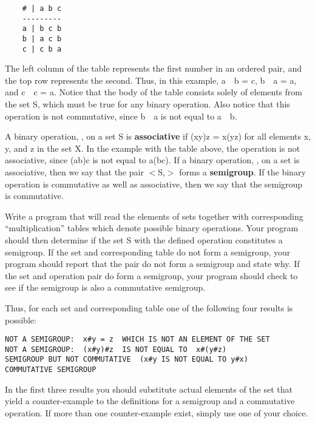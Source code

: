 \begin{verbatim}
	# | a b c
	---------
	a | b c b
	b | a c b
	c | c b a
\end{verbatim}

The left column of the table represents the first number in an ordered
pair, and the top row represents the second.  Thus, in this example,
a~\op~b = c, b~\op~a = a, and c~\op~c = a.  Notice that the body of
the table consists solely of elements from the set S, which must be
true for any binary operation.  Also notice that this operation is not
commutative, since b~\op~a is not equal to a~\op~b.

A binary operation, \op, on a set S is {\bf associative} if
(x{\op}y){\op}z = x{\op}(y{\op}z) for all elements x, y, and z in the
set X.  In the example with the table above, the operation is not
associative, since (a{\op}b){\op}c is not equal to a{\op}(b{\op}c).
If a binary operation, \op, on a set is associative, then we say that
the pair $<$S,\op$>$ forms a {\bf semigroup}.  If the binary operation
is commutative as well as associative, then we say that the semigroup
is commutative.

\bigskip
{}

Write a program that will read the elements of sets together with
corresponding ``multiplication'' tables which denote possible binary
operations.  Your program should then determine if the set S with the
defined operation constitutes a semigroup.  If the set and
corresponding table do not form a semigroup, your program should
report that the pair do not form a semigroup and state why.  If the
set and operation pair do form a semigroup, your program should check
to see if the semigroup is also a commutative semigroup.

Thus, for each set and corresponding table one of the following four
results is possible:

{\small
\begin{verbatim}
NOT A SEMIGROUP:  x#y = z  WHICH IS NOT AN ELEMENT OF THE SET
NOT A SEMIGROUP:  (x#y)#z  IS NOT EQUAL TO  x#(y#z)
SEMIGROUP BUT NOT COMMUTATIVE  (x#y IS NOT EQUAL TO y#x)
COMMUTATIVE SEMIGROUP
\end{verbatim}
}

In the first three results you should substitute actual elements of
the set that yield a counter-example to the definitions for a
semigroup and a commutative operation.  If more than one
counter-example exist, simply use one of your choice.

